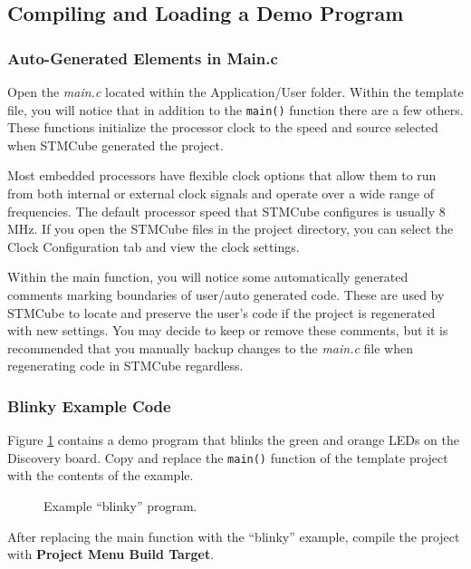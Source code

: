\documentclass[11pt,fleqn]{book} %
\newcommand{\code}[3]{
    \begin{figure}[]
        \colorbox{gray!20!white}{
            \parbox{\linewidth-2\fboxsep} {
                \centering 
                
            }
        }
        \caption{#2}
        \label{#3}
    \end{figure}
}
\begin{document}
\subsection{Compiling and Loading a Demo Program }
\subsubsection{Auto-Generated Elements in Main.c}
Open the \textit{main.c} located within the Application/User folder. Within the template file, you will notice that in addition to the \texttt{main()} function there are a few others. These functions initialize the processor clock to the speed and source selected when STMCube generated the project. 

Most embedded processors have flexible clock options that allow them to run from both internal or external clock signals and operate over a wide range of frequencies. The default processor speed that STMCube configures is usually 8 MHz. If you open the STMCube files in the project directory, you can select the Clock Configuration tab and view the clock settings.

Within the main function, you will notice some automatically generated comments marking boundaries of user/auto generated code. These are used by STMCube to locate and preserve the user's code if the project is regenerated with new settings. You may decide to keep or remove these comments, but it is recommended that you manually backup changes to the \textit{main.c} file when regenerating code in STMCube regardless. 

\subsubsection{Blinky Example Code}
Figure \ref{blinky1} contains a demo program that blinks the green and orange LEDs on the Discovery board. Copy and replace the \texttt{main()} function of the template project with the contents of the example. 

%		

\code{./Files/blinky.c}{Example ``blinky'' program.}{blinky1}

After replacing the main function with the ``blinky'' example, compile the project with \textbf{Project Menu \textrightarrow Build Target}. 
\end{document}
